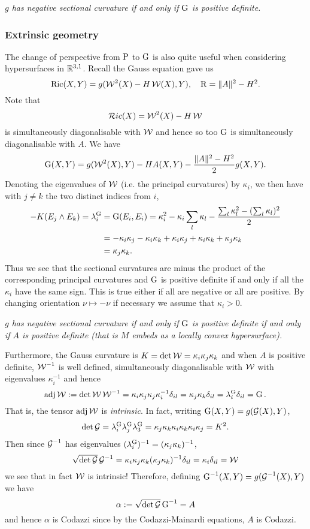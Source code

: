 \documentclass[a4paper, 12pt]{amsart}
\begin{document}
\vfill
\emph{\(g\) has negative sectional curvature if and only if \(\operatorname{G}\) is positive definite.}
\vfill


\subsubsection{Extrinsic geometry}

The change of perspective from \(\operatorname{P}\) to \(\operatorname{G}\) is also quite useful when considering hypersurfaces in \(\mathbb{R}^{3,1}\). Recall the Gauss equation gave us
\[
\operatorname{Ric}(X, Y) = g(\operatorname{\mathcal{W}}^2(X) - H \operatorname{\mathcal{W}}(X), Y), \quad \operatorname{R} = \|A\|^2 - H^2.
\]
Note that
\[
\mathcal{R}ic (X) = \operatorname{\mathcal{W}}^2(X) - H \operatorname{\mathcal{W}}
\]
is simultaneously diagonalisable with \(\operatorname{\mathcal{W}}\) and hence so too \(\operatorname{G}\) is simultaneously diagonalisable with \(A\). We have
\[
\operatorname{G} (X, Y) = g(\operatorname{\mathcal{W}}^2(X), Y) - H A(X, Y) - \frac{\|A\|^2 - H^2}{2} g (X, Y).
\]
Denoting the eigenvalues of \(\operatorname{\mathcal{W}}\) (i.e. the principal curvatures) by \(\kappa_i\), we then have with \(j \ne k\) the two distinct indices from \(i\),
\[
\begin{split}
-K(E_j \wedge E_k) = \lambda^{\operatorname{G}}_i &= \operatorname{G}(E_i, E_i) = \kappa_i^2 - \kappa_i \sum_l \kappa_l - \frac{\sum_l \kappa_l^2 - (\sum_l \kappa_l)^2}{2} \\
&= - \kappa_i \kappa_j - \kappa_i \kappa_k + \kappa_i \kappa_j + \kappa_i \kappa_k + \kappa_j \kappa_k \\
&= \kappa_j \kappa_k.
\end{split}
\]
Thus we see that the sectional curvatures are minus the product of the corresponding principal curvatures and \(\operatorname{G}\) is positive definite if and only if all the \(\kappa_i\) have the same sign. This is true either if all are negative or all are positive. By changing orientation \(\nu \mapsto -\nu\) if necessary we assume that \(\kappa_i > 0\).

\vfill
\emph{\(g\) has negative sectional curvature if and only if \(\operatorname{G}\) is positive definite if and only if \(A\) is positive definite (that is \(M\) embeds as a locally convex hypersurface).}
\vfill

Furthermore, the Gauss curvature is \(K = \det \operatorname{\mathcal{W}} = \kappa_i \kappa_j \kappa_k\) and when \(A\) is positive definite, \(\operatorname{\mathcal{W}}^{-1}\) is well defined, simultaneously diagonalisable with \(\operatorname{\mathcal{W}}\) with eigenvalues \(\kappa_i^{-1}\) and hence
\[
\operatorname{adj} \operatorname{\mathcal{W}} := \det \operatorname{\mathcal{W}} \operatorname{\mathcal{W}}^{-1} = \kappa_i \kappa_j \kappa_j \kappa_i^{-1} \delta_{il} = \kappa_j \kappa_k \delta_{il} = \lambda^{\operatorname{G}}_i \delta_{il} = \operatorname{G}.
\]
That is, the tensor \(\operatorname{adj} \operatorname{\mathcal{W}}\) is \emph{intrinsic}. In fact, writing \(\operatorname{G}(X, Y) = g(\operatorname{\mathcal{G}} (X), Y)\),
\[
\det \operatorname{\mathcal{G}} = \lambda^{\operatorname{G}}_i \lambda^{\operatorname{G}}_j \lambda^{\operatorname{G}}_3 = \kappa_j \kappa_k \kappa_i \kappa_k \kappa_i \kappa_j = K^2.
\]
Then since \(\operatorname{\mathcal{G}}^{-1}\) has eigenvalues \((\lambda_i^{\operatorname{G}})^{-1} = (\kappa_j \kappa_k)^{-1}\),
\[
\sqrt{\det \operatorname{\mathcal{G}}} \operatorname{\mathcal{G}}^{-1} = \kappa_i \kappa_j \kappa_k (\kappa_j \kappa_k)^{-1} \delta_{il} = \kappa_i \delta_{il} = \operatorname{\mathcal{W}}
\]
we see that in fact \(\operatorname{\mathcal{W}}\) is intrinsic! Therefore, defining \(\operatorname{G}^{-1}(X, Y) = g(\operatorname{\mathcal{G}}^{-1} (X), Y)\) we have
\[
\alpha := \sqrt{\det \operatorname{\mathcal{G}}} \operatorname{G}^{-1} = A
\]
and hence \(\alpha\) is Codazzi since by the Codazzi-Mainardi equations, \(A\) is Codazzi.
\end{document}
